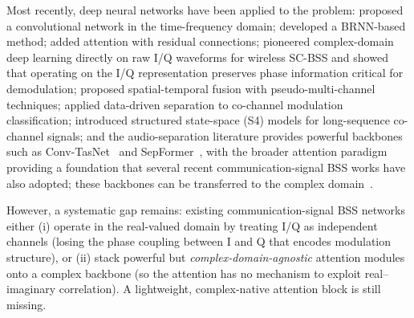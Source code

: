 \documentclass[twocolumn,english]{svjour3}
\begin{document}
\begin{sloppypar}
Most recently, deep neural networks have been applied to the problem: \cite{hou2022single} proposed a convolutional network in the time-frequency domain; \cite{chen2019deep} developed a BRNN-based method; \cite{ma2023novel} added attention with residual connections; \cite{guo2024single} pioneered complex-domain deep learning directly on raw I/Q waveforms for wireless SC-BSS and showed that operating on the I/Q representation preserves phase information critical for demodulation; \cite{luo2023single} proposed spatial-temporal fusion with pseudo-multi-channel techniques; \cite{deng2024co} applied data-driven separation to co-channel modulation classification; \cite{s4unet2026} introduced structured state-space (S4) models for long-sequence co-channel signals; and the audio-separation literature provides powerful backbones such as Conv-TasNet~\cite{luo2019conv} and SepFormer~\cite{subakan2021sepformer}, with the broader attention paradigm~\cite{vaswani2017attention} providing a foundation that several recent communication-signal BSS works have also adopted; these backbones can be transferred to the complex domain~\cite{trabelsi2018deep,zhao2021deepwaveform}.
\end{sloppypar}

\begin{sloppypar}
However, a systematic gap remains: existing communication-signal BSS networks either (i) operate in the real-valued domain by treating I/Q as independent channels (losing the phase coupling between I and Q that encodes modulation structure), or (ii) stack powerful but \emph{complex-domain-agnostic} attention modules onto a complex backbone (so the attention has no mechanism to exploit real--imaginary correlation). A lightweight, complex-native attention block is still missing.
\end{sloppypar}
\end{document}
